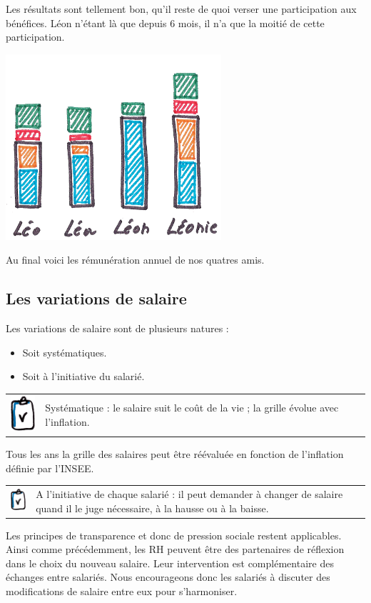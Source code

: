 \documentclass[12pt]{article}
\newcommand{\regle}[1]{%
  \begin{tcolorbox}[colframe=DarkOrange,boxrule=2pt,arc=4pt,left=6pt,right=6pt,top=6pt,bottom=6pt,boxsep=0pt,colback=Aluminium1]
    \begin{tabular}{m{1.0cm} m{11.5cm}}
      \includegraphics[width=1.0cm]{includes/rules} & #1 \\
    \end{tabular}
  \end{tcolorbox}
}
\begin{document}
 Les résultats sont tellement bon, qu’il reste de quoi verser une participation aux bénéfices. Léon n’étant là que depuis 6 mois, il n’a que la moitié de cette participation.

 \begin{center}
 \includegraphics[width=0.6\textwidth]{includes/remuneration}
 \end{center}
 Au final voici les rémunération annuel de nos quatres amis.

\subsection{Les variations de salaire}
\label{sec.variation-salaire}
 Les variations de salaire sont de plusieurs natures : 
 \begin{itemize}
   \item Soit systématiques.
   \item Soit à l’initiative du salarié.
 \end{itemize}

 \vspace{3mm}
 \regle{Systématique : le salaire suit le coût de la vie ; la grille évolue avec l’inflation.}

 Tous les ans la grille des salaires peut être réévaluée en fonction de l’inflation définie par l’INSEE.

 \regle{A l'initiative de chaque salarié : il peut demander à changer de salaire quand il le juge nécessaire, à la hausse ou à la baisse.}

 Les principes de transparence et donc de pression sociale restent applicables. Ainsi comme précédemment, les RH peuvent être des partenaires de réflexion dans le choix du nouveau salaire. Leur intervention est complémentaire des échanges entre salariés. Nous encourageons donc les salariés à discuter des modifications de salaire entre eux pour s’harmoniser. 
\end{document}
